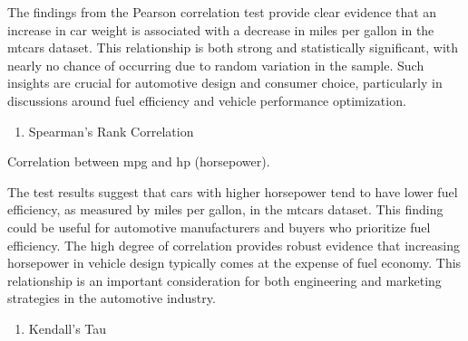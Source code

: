 \documentclass[
]{book}
\newenvironment{Shaded}{\begin{snugshade}}{\end{snugshade}}
\newcommand{\AttributeTok}[1]{\textcolor[rgb]{0.13,0.29,0.53}{#1}}
\newcommand{\CommentTok}[1]{\textcolor[rgb]{0.56,0.35,0.01}{\textit{#1}}}
\newcommand{\FunctionTok}[1]{\textcolor[rgb]{0.13,0.29,0.53}{\textbf{#1}}}
\newcommand{\NormalTok}[1]{#1}
\newcommand{\SpecialCharTok}[1]{\textcolor[rgb]{0.81,0.36,0.00}{\textbf{#1}}}
\newcommand{\StringTok}[1]{\textcolor[rgb]{0.31,0.60,0.02}{#1}}
\providecommand{\tightlist}{%
  \setlength{\itemsep}{0pt}\setlength{\parskip}{0pt}}
\begin{document}
The findings from the Pearson correlation test provide clear evidence that an increase in car weight is associated with a decrease in miles per gallon in the mtcars dataset. This relationship is both strong and statistically significant, with nearly no chance of occurring due to random variation in the sample. Such insights are crucial for automotive design and consumer choice, particularly in discussions around fuel efficiency and vehicle performance optimization.

\begin{enumerate}
\def\labelenumi{\alph{enumi}.}
\setcounter{enumi}{1}
\tightlist
\item
  Spearman's Rank Correlation
\end{enumerate}

Correlation between mpg and hp (horsepower).

\begin{Shaded}
\end{Shaded}

The test results suggest that cars with higher horsepower tend to have lower fuel efficiency, as measured by miles per gallon, in the mtcars dataset. This finding could be useful for automotive manufacturers and buyers who prioritize fuel efficiency. The high degree of correlation provides robust evidence that increasing horsepower in vehicle design typically comes at the expense of fuel economy. This relationship is an important consideration for both engineering and marketing strategies in the automotive industry.

\begin{enumerate}
\def\labelenumi{\alph{enumi}.}
\setcounter{enumi}{2}
\tightlist
\item
  Kendall's Tau
\end{enumerate}
\end{document}
